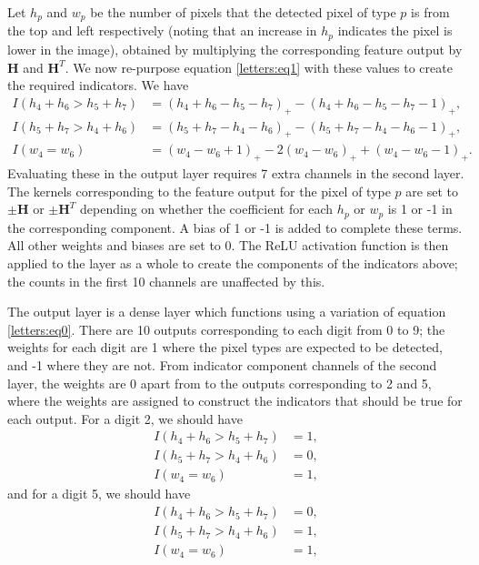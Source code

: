 \documentclass{somasmsc}
\begin{document}
Let $h_p$ and $w_p$ be the number of pixels that the detected pixel of type $p$ is from the top and left respectively (noting that an increase in $h_p$ indicates the pixel is lower in the image), obtained by multiplying the corresponding feature output by $\mathbf{H}$ and $\mathbf{H}^T$. We now re-purpose equation \ref{letters:eq1} with these values to create the required indicators. We have
\begin{align*}
    I(h_4 + h_6 > h_5 + h_7) &= \left(h_4 + h_6 - h_5 - h_7\right)_+ - \left(h_4 + h_6 - h_5 - h_7 - 1\right)_+, \\
    I(h_5 + h_7 > h_4 + h_6) &= \left(h_5 + h_7 - h_4 - h_6\right)_+ - \left(h_5 + h_7 - h_4 - h_6 - 1\right)_+, \\
    I(w_4 = w_6) &= \left(w_4 - w_6 + 1\right)_+ - 2\left(w_4 - w_6\right)_+ + \left(w_4 - w_6 - 1\right)_+.
\end{align*}
Evaluating these in the output layer requires 7 extra channels in the second layer. The kernels corresponding to the feature output for the pixel of type $p$ are set to $\pm \mathbf{H}$ or $\pm \mathbf{H}^T$ depending on whether the coefficient for each $h_p$ or $w_p$ is 1 or -1 in the corresponding component. A bias of 1 or -1 is added to complete these terms. All other weights and biases are set to 0. The ReLU activation function is then applied to the layer as a whole to create the components of the indicators above; the counts in the first 10 channels are unaffected by this.

The output layer is a dense layer which functions using a variation of equation \ref{letters:eq0}. There are 10 outputs corresponding to each digit from 0 to 9; the weights for each digit are 1 where the pixel types are expected to be detected, and -1 where they are not. From indicator component channels of the second layer, the weights are 0 apart from to the outputs corresponding to 2 and 5, where the weights are assigned to construct the indicators that should be true for each output. For a digit 2, we should have
\begin{align*}
    I(h_4 + h_6 > h_5 + h_7) &= 1, \\
    I(h_5 + h_7 > h_4 + h_6) &= 0, \\
    I(w_4 = w_6) &= 1,
\end{align*}
and for a digit 5, we should have
\begin{align*}
    I(h_4 + h_6 > h_5 + h_7) &= 0, \\
    I(h_5 + h_7 > h_4 + h_6) &= 1, \\
    I(w_4 = w_6) &= 1,
\end{align*}
\end{document}
